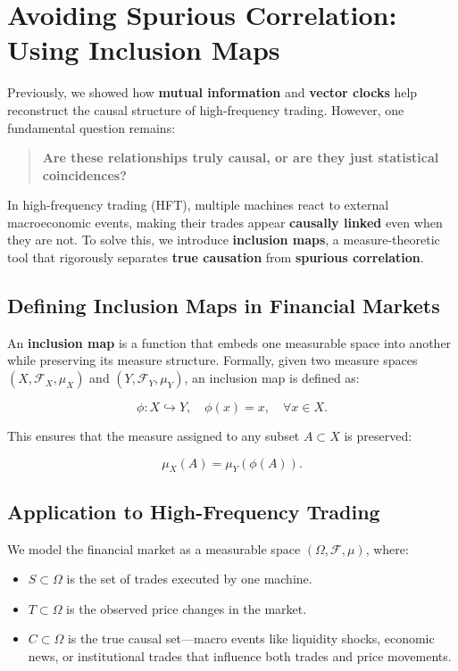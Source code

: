 \section{Avoiding Spurious Correlation: Using Inclusion Maps}

Previously, we showed how \textbf{mutual information} and \textbf{vector clocks} help reconstruct the causal structure of high-frequency trading. However, one fundamental question remains:

\begin{quote}
    \textbf{Are these relationships truly causal, or are they just statistical coincidences?}
\end{quote}

In high-frequency trading (HFT), multiple machines react to external macroeconomic events, making their trades appear \textbf{causally linked} even when they are not. To solve this, we introduce \textbf{inclusion maps}, a measure-theoretic tool that rigorously separates \textbf{true causation} from \textbf{spurious correlation}.

\subsection{Defining Inclusion Maps in Financial Markets}

An \textbf{inclusion map} is a function that embeds one measurable space into another while preserving its measure structure. Formally, given two measure spaces \( (X, \mathcal{F}_X, \mu_X) \) and \( (Y, \mathcal{F}_Y, \mu_Y) \), an inclusion map is defined as:

\[
\phi: X \hookrightarrow Y, \quad \phi(x) = x, \quad \forall x \in X.
\]

This ensures that the measure assigned to any subset \( A \subset X \) is preserved:

\[
\mu_X(A) = \mu_Y(\phi(A)).
\]

\subsection{Application to High-Frequency Trading}

We model the financial market as a measurable space \( (\Omega, \mathcal{F}, \mu) \), where:

\begin{itemize}
    \item \( S \subset \Omega \) is the set of trades executed by one machine.
    \item \( T \subset \Omega \) is the observed price changes in the market.
    \item \( C \subset \Omega \) is the true causal set—macro events like liquidity shocks, economic news, or institutional trades that influence both trades and price movements.
\end{itemize}

